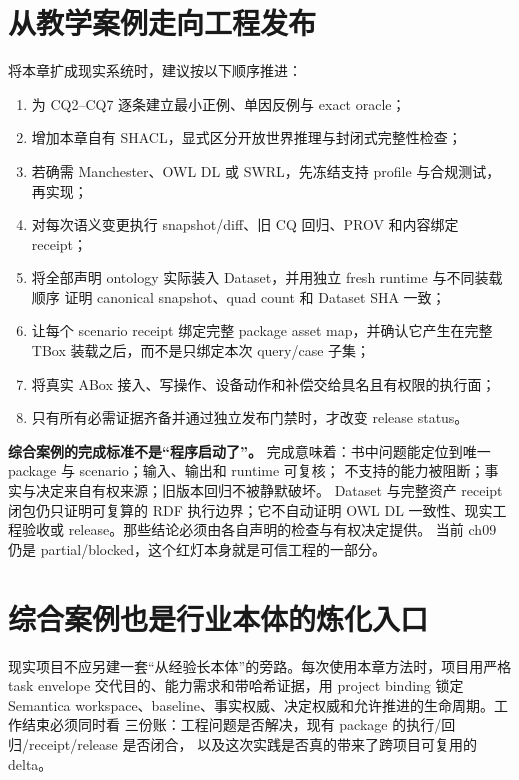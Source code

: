 \section{从教学案例走向工程发布}

将本章扩成现实系统时，建议按以下顺序推进：

\begin{enumerate}
\item 为 CQ2--CQ7 逐条建立最小正例、单因反例与 exact oracle；
\item 增加本章自有 SHACL，显式区分开放世界推理与封闭式完整性检查；
\item 若确需 Manchester、OWL DL 或 SWRL，先冻结支持 profile 与合规测试，再实现；
\item 对每次语义变更执行 snapshot/diff、旧 CQ 回归、PROV 和内容绑定 receipt；
\item 将全部声明 ontology 实际装入 Dataset，并用独立 fresh runtime 与不同装载顺序
      证明 canonical snapshot、quad count 和 Dataset SHA 一致；
\item 让每个 scenario receipt 绑定完整 package asset map，并确认它产生在完整 TBox
      装载之后，而不是只绑定本次 query/case 子集；
\item 将真实 ABox 接入、写操作、设备动作和补偿交给具名且有权限的执行面；
\item 只有所有必需证据齐备并通过独立发布门禁时，才改变 release status。
\end{enumerate}

\begin{noteblock}
\textbf{综合案例的完成标准不是“程序启动了”。}
完成意味着：书中问题能定位到唯一 package 与 scenario；输入、输出和 runtime 可复核；
不支持的能力被阻断；事实与决定来自有权来源；旧版本回归不被静默破坏。
Dataset 与完整资产 receipt 闭包仍只证明可复算的 RDF 执行边界；它不自动证明 OWL DL
一致性、现实工程验收或 release。那些结论必须由各自声明的检查与有权决定提供。
当前 ch09 仍是 partial/blocked，这个红灯本身就是可信工程的一部分。
\end{noteblock}

\section{综合案例也是行业本体的炼化入口}

现实项目不应另建一套“从经验长本体”的旁路。每次使用本章方法时，项目用严格
task envelope 交代目的、能力需求和带哈希证据，用 project binding 锁定 Semantica
workspace、baseline、事实权威、决定权威和允许推进的生命周期。工作结束必须同时看
三份账：工程问题是否解决，现有 package 的执行/回归/receipt/release 是否闭合，
以及这次实践是否真的带来了跨项目可复用的 delta。

